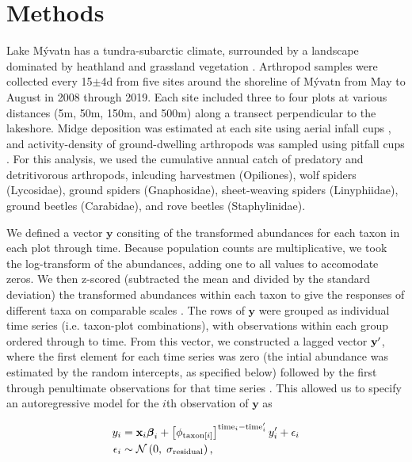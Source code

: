 

\section*{Methods}

Lake M\'{y}vatn has a tundra-subarctic climate, surrounded by a landscape
dominated by heathland and grassland vegetation \citep{Einarsson2004}.
Arthropod samples were collected every 15$\pm$4d from five sites around the
shoreline of M\'{y}vatn from May to August in 2008 through 2019.
Each site included three to four plots at various distances
(5m, 50m, 150m, and 500m) along a transect perpendicular to the lakeshore.
Midge deposition was estimated at each site using aerial infall cups \citep{Dreyer2015},
and activity-density of ground-dwelling arthropods was sampled using pitfall cups
\citep{Southwood2009}.
For this analysis, we used the cumulative annual catch of predatory and
detritivorous arthropods,
inlcuding harvestmen (Opiliones),
wolf spiders (Lycosidae),
ground spiders (Gnaphosidae),
sheet-weaving spiders (Linyphiidae),
ground beetles (Carabidae),
and rove beetles (Staphylinidae).

We defined a vector $\mathbf{y}$ consiting of the transformed abundances for each taxon
in each plot through time.
Because population counts are multiplicative, we took the log-transform of the abundances,
adding one to all values to accomodate zeros.
We then z-scored (subtracted the mean and divided by the standard deviation)
the transformed abundances within each taxon
to give the responses of different taxa on comparable scales \citep{Jackson2012}.
The rows of $\mathbf{y}$ were grouped as individual time series
(i.e. taxon-plot combinations),
with observations within each group ordered through to time.
From this vector,
we constructed a lagged vector $\mathbf{y\sp{\prime}}$,
where the first element for each time series was zero
(the intial abundance was estimated by the random intercepts, as specified below)
followed by the first through
penultimate observations for that time series \citep{Ives2006}.
This allowed us to specify an autoregressive model for the $i$th observation of
$\mathbf{y}$ as

\begin{equation} \label{eq:y-i}
\begin{split}
    y_i &= \mathbf{x}_i {\boldsymbol\beta}_i +
        \left[ \phi_{\text{taxon}[i]} \right]^{\text{time}_i - \text{time}\sp{\prime}_i}
        y\sp{\prime}_i + \epsilon_i \\
    \epsilon_i &\sim \mathcal{N} \left(0, \; \sigma_{\text{residual}} \right)
    \text{,}
\end{split}
\end{equation}

